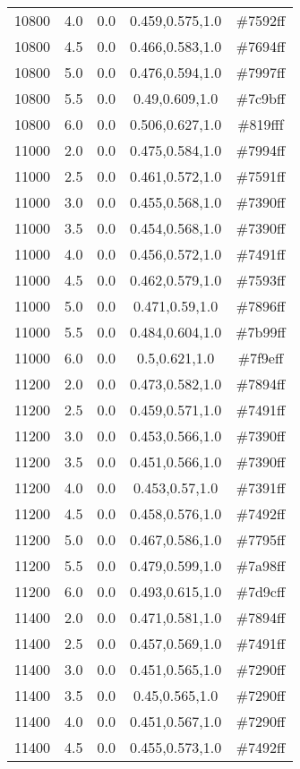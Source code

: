 \begin{tabular}{ccccc}
10800 & 4.0 & 0.0 & 0.459,0.575,1.0 & \#7592ff \\ 
10800 & 4.5 & 0.0 & 0.466,0.583,1.0 & \#7694ff \\ 
10800 & 5.0 & 0.0 & 0.476,0.594,1.0 & \#7997ff \\ 
10800 & 5.5 & 0.0 & 0.49,0.609,1.0 & \#7c9bff \\ 
10800 & 6.0 & 0.0 & 0.506,0.627,1.0 & \#819fff \\ 
11000 & 2.0 & 0.0 & 0.475,0.584,1.0 & \#7994ff \\ 
11000 & 2.5 & 0.0 & 0.461,0.572,1.0 & \#7591ff \\ 
11000 & 3.0 & 0.0 & 0.455,0.568,1.0 & \#7390ff \\ 
11000 & 3.5 & 0.0 & 0.454,0.568,1.0 & \#7390ff \\ 
11000 & 4.0 & 0.0 & 0.456,0.572,1.0 & \#7491ff \\ 
11000 & 4.5 & 0.0 & 0.462,0.579,1.0 & \#7593ff \\ 
11000 & 5.0 & 0.0 & 0.471,0.59,1.0 & \#7896ff \\ 
11000 & 5.5 & 0.0 & 0.484,0.604,1.0 & \#7b99ff \\ 
11000 & 6.0 & 0.0 & 0.5,0.621,1.0 & \#7f9eff \\ 
11200 & 2.0 & 0.0 & 0.473,0.582,1.0 & \#7894ff \\ 
11200 & 2.5 & 0.0 & 0.459,0.571,1.0 & \#7491ff \\ 
11200 & 3.0 & 0.0 & 0.453,0.566,1.0 & \#7390ff \\ 
11200 & 3.5 & 0.0 & 0.451,0.566,1.0 & \#7390ff \\ 
11200 & 4.0 & 0.0 & 0.453,0.57,1.0 & \#7391ff \\ 
11200 & 4.5 & 0.0 & 0.458,0.576,1.0 & \#7492ff \\ 
11200 & 5.0 & 0.0 & 0.467,0.586,1.0 & \#7795ff \\ 
11200 & 5.5 & 0.0 & 0.479,0.599,1.0 & \#7a98ff \\ 
11200 & 6.0 & 0.0 & 0.493,0.615,1.0 & \#7d9cff \\ 
11400 & 2.0 & 0.0 & 0.471,0.581,1.0 & \#7894ff \\ 
11400 & 2.5 & 0.0 & 0.457,0.569,1.0 & \#7491ff \\ 
11400 & 3.0 & 0.0 & 0.451,0.565,1.0 & \#7290ff \\ 
11400 & 3.5 & 0.0 & 0.45,0.565,1.0 & \#7290ff \\ 
11400 & 4.0 & 0.0 & 0.451,0.567,1.0 & \#7290ff \\ 
11400 & 4.5 & 0.0 & 0.455,0.573,1.0 & \#7492ff \\ 

\end{tabular}
